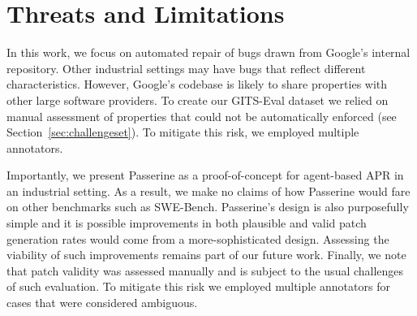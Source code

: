 \section{Threats and Limitations}
\label{sec:threats}
In this work, we focus on automated repair of bugs drawn from Google's internal repository.
Other industrial settings may have bugs that reflect different characteristics. However,
Google's codebase is likely to share properties with other large software providers.
To create our GITS-Eval dataset we relied on manual assessment of properties that could
not be automatically enforced (see Section~\ref{sec:challengeset}). To mitigate this risk,
we employed multiple annotators.


Importantly, we present Passerine as a proof-of-concept for agent-based APR in an industrial setting.
As a result, we make no claims of how Passerine would fare on other benchmarks such as SWE-Bench. Passerine's
design is also purposefully simple and it is possible improvements in both plausible and valid patch generation
rates would come from a more-sophisticated design. Assessing the viability of such improvements remains part of 
our future work. Finally, we note that patch validity was assessed manually and is subject to the usual
challenges of such evaluation. To mitigate this risk we employed multiple annotators for cases that
were considered ambiguous.

